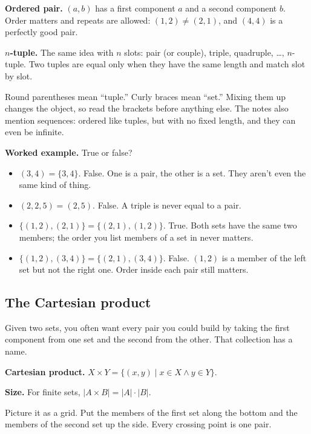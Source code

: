 \begin{notebox}
\textbf{Ordered pair.} $(a,b)$ has a first component $a$ and a second component $b$. Order matters and repeats are allowed: $(1,2)\neq(2,1)$, and $(4,4)$ is a perfectly good pair.

\textbf{$n$-tuple.} The same idea with $n$ slots: pair (or couple), triple, quadruple, \dots, $n$-tuple. Two tuples are equal only when they have the same length and match slot by slot.
\end{notebox}

Round parentheses mean ``tuple.'' Curly braces mean ``set.'' Mixing them up changes the object, so read the brackets before anything else. The notes also mention sequences: ordered like tuples, but with no fixed length, and they can even be infinite.

\textbf{Worked example.} True or false?
\begin{itemize}
\item $(3,4)=\{3,4\}$. False. One is a pair, the other is a set. They aren't even the same kind of thing.
\item $(2,2,5)=(2,5)$. False. A triple is never equal to a pair.
\item $\{(1,2),(2,1)\}=\{(2,1),(1,2)\}$. True. Both sets have the same two members; the order you list members of a set in never matters.
\item $\{(1,2),(3,4)\}=\{(2,1),(3,4)\}$. False. $(1,2)$ is a member of the left set but not the right one. Order inside each pair still matters.
\end{itemize}

\subsection{The Cartesian product}

Given two sets, you often want every pair you could build by taking the first component from one set and the second from the other. That collection has a name.

\begin{notebox}
\textbf{Cartesian product.} $X\times Y=\{(x,y)\mid x\in X\land y\in Y\}$.

\textbf{Size.} For finite sets, $|A\times B|=|A|\cdot|B|$.
\end{notebox}

Picture it as a grid. Put the members of the first set along the bottom and the members of the second set up the side. Every crossing point is one pair.

